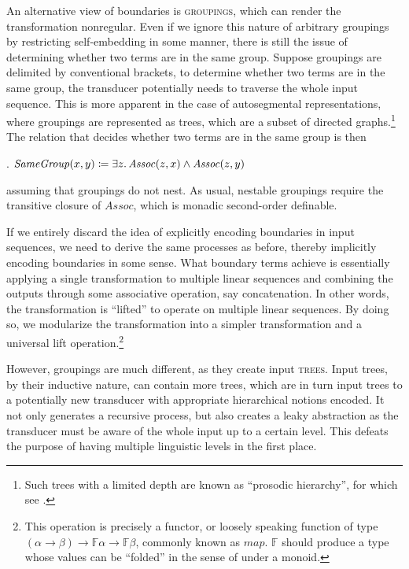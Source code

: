 \documentclass[12pt, a4paper]{report}
\newcommand{\textemph}[1]{\textsc{#1}}
\newcommand{\textterm}[1]{\textsc{#1}\index{#1}}
\begin{document}
An alternative view of boundaries is \textterm{groupings}, which can
render the transformation nonregular.  Even if we ignore this nature
of arbitrary groupings by restricting self-embedding in some manner,
there is still the issue of determining whether two terms are in the
same group.  Suppose groupings are delimited by conventional brackets,
to determine whether two terms are in the same group, the transducer
potentially needs to traverse the whole input sequence.  This is more
apparent in the case of autosegmental representations, where groupings
are represented as trees, which are a subset of directed
graphs.\footnote{Such trees with a limited depth are known as
  \enquote{prosodic hierarchy}, for which see \textcite{nv86pp}.} The
relation that decides whether two terms are in the same group is then

\ex. \(\mathit{SameGroup}(x, y) \coloneq \exists z\ldotp
\mathit{Assoc}(z, x) \land \mathit{Assoc}(z, y)\)

assuming that groupings do not nest.  As usual, nestable groupings
require the transitive closure of \(\mathit{Assoc}\), which is monadic
second-order definable.

If we entirely discard the idea of explicitly encoding boundaries in
input sequences, we need to derive the same processes as before,
thereby implicitly encoding boundaries in some sense.  What boundary
terms achieve is essentially applying a single transformation to
multiple linear sequences and combining the outputs through some
associative operation, say concatenation.  In other words, the
transformation is \enquote{lifted} to operate on multiple linear
sequences.  By doing so, we modularize the transformation into a
simpler transformation and a universal lift operation.\footnote{This
  operation is precisely a functor, or loosely speaking function of
  type
  \((\alpha \to \beta) \to \mathbb{F}\alpha \to \mathbb{F}\beta\),
  commonly known as \(\mathit{map}\).  \(\mathbb{F}\) should produce a
  type whose values can be \enquote{folded} in the sense of
  \textcite{h99tuem} under a monoid.}

However, groupings are much different, as they create input
\textemph{trees}.  Input trees, by their inductive nature, can contain
more trees, which are in turn input trees to a potentially new
transducer with appropriate hierarchical notions encoded.  It not only
generates a recursive process, but also creates a leaky abstraction as
the transducer must be aware of the whole input up to a certain level.
This defeats the purpose of having multiple linguistic levels in the
first place.
\end{document}
